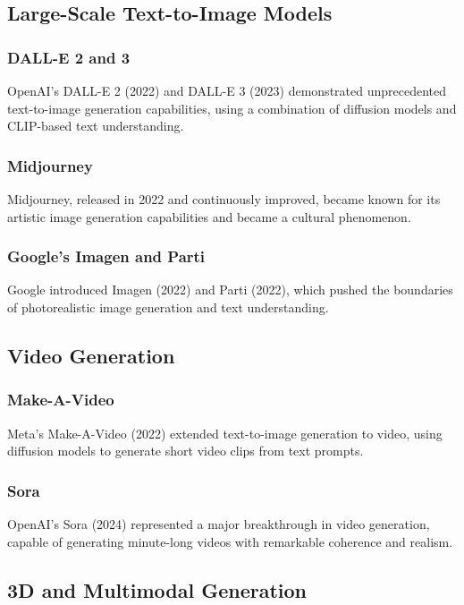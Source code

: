 \subsection*{Large-Scale Text-to-Image Models}

\subsubsection*{DALL-E 2 and 3}
OpenAI's DALL-E 2 (2022) and DALL-E 3 (2023) demonstrated unprecedented text-to-image generation capabilities, using a combination of diffusion models and CLIP-based text understanding.

\subsubsection*{Midjourney}
Midjourney, released in 2022 and continuously improved, became known for its artistic image generation capabilities and became a cultural phenomenon.

\subsubsection*{Google's Imagen and Parti}
Google introduced Imagen (2022) and Parti (2022), which pushed the boundaries of photorealistic image generation and text understanding.

\subsection*{Video Generation}

\subsubsection*{Make-A-Video}
Meta's Make-A-Video (2022) extended text-to-image generation to video, using diffusion models to generate short video clips from text prompts.

\subsubsection*{Sora}
OpenAI's Sora (2024) represented a major breakthrough in video generation, capable of generating minute-long videos with remarkable coherence and realism.

\subsection*{3D and Multimodal Generation}

